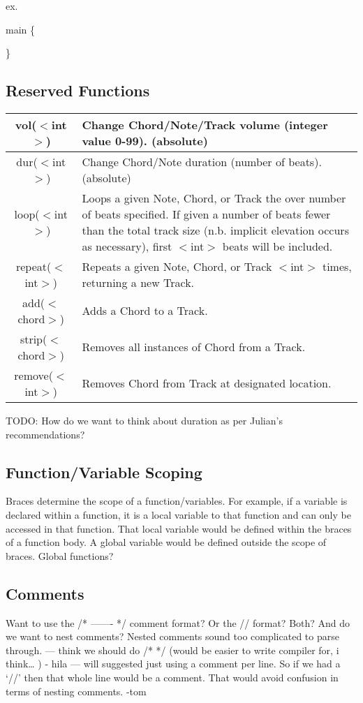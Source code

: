 \documentclass[letterpaper]{article}
\begin{document}
ex.

main \{

\}

\subsection{Reserved Functions}
\begin{table}[H]
\centering
\begin{tabularx}{.75\textwidth}{|c|X|}
\hline
vol($<$int$>$) & Change Chord/Note/Track volume (integer value 0-99). (absolute) \\
\hline
dur($<$int$>$) & Change Chord/Note duration (number of beats). (absolute) \\
\hline
loop($<$int$>$) & Loops a given Note, Chord, or Track the over number of beats specified. If given a number of beats fewer than the total track size (n.b. implicit elevation occurs as necessary), first $<$int$>$ beats will be included. \\
\hline
repeat($<$int$>$) & Repeats a given Note, Chord, or Track $<$int$>$ times, returning a new Track. \\
\hline
add($<$chord$>$) & Adds a Chord to a Track. \\
\hline
strip($<$chord$>$) & Removes all instances of Chord from a Track. \\
\hline
remove($<$int$>$) & Removes Chord from Track at designated location. \\
\hline
\end{tabularx}
\end{table}
TODO: How do we want to think about duration as per Julian's recommendations?

\subsection{Function/Variable Scoping}
Braces determine the scope of a function/variables. For example, if a variable is declared within a function, it is a local variable to that function and can only be accessed in that function. That local variable would be defined within the braces of a function body. A global variable would be defined outside the scope of braces.
Global functions?

\subsection{Comments} 
Want to use the /* ------- */ comment format? Or the // format? Both?
And do we want to nest comments? Nested comments sound too complicated to parse through. 
---  think we should do /* */ (would be easier to write compiler for, i think… ) - hila
--- will suggested just using a comment per line. So if we had a ‘//’ then that whole line would be a comment. That would avoid confusion in terms of nesting comments. -tom
\end{document}
